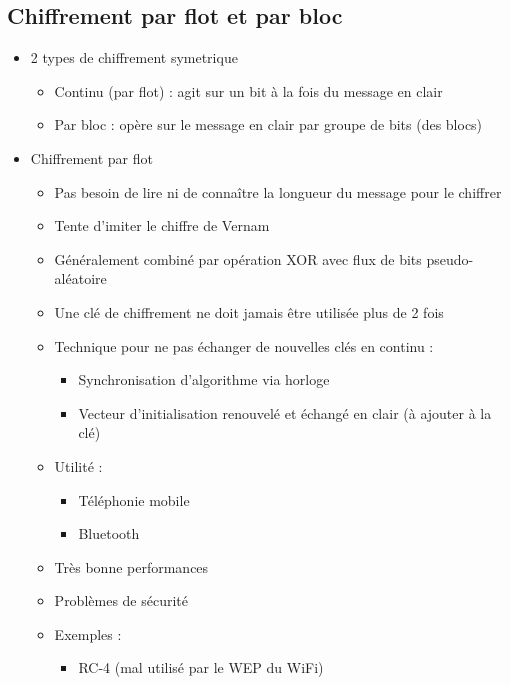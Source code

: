 \documentclass[a4paper]{article}
\begin{document}
\subsection{Chiffrement par flot et par bloc}
\begin{itemize}[label=\textbullet, font=\Large]
    \item 2 types de chiffrement symetrique
    \begin{itemize}[label=, font=\scriptsize]
        \item Continu (par flot) : agit sur un bit à la fois du message en clair
        \item Par bloc : opère sur le message en clair par groupe de bits (des blocs)
    \end{itemize}
    \item Chiffrement par flot
    \begin{itemize}[label=, font=\scriptsize]
        \item Pas besoin de lire ni de connaître la longueur du message pour le chiffrer
        \item Tente d'imiter le chiffre de Vernam
        \item Généralement combiné par opération XOR avec flux de bits pseudo-aléatoire
        \item Une clé de chiffrement ne doit jamais être utilisée plus de 2 fois
        \item Technique pour ne pas échanger de nouvelles clés en continu :
        \begin{itemize}
            \item Synchronisation d'algorithme via horloge
            \item Vecteur d'initialisation renouvelé et échangé en clair (à ajouter à la clé)
        \end{itemize}
        \item Utilité :
        \begin{itemize}
            \item Téléphonie mobile
            \item Bluetooth
        \end{itemize}
        \item Très bonne performances
        \item Problèmes de sécurité
        \item Exemples :
        \begin{itemize}
            \item RC-4 (mal utilisé par le WEP du WiFi)

\end{itemize}
\end{itemize}
\end{itemize}
\end{document}
